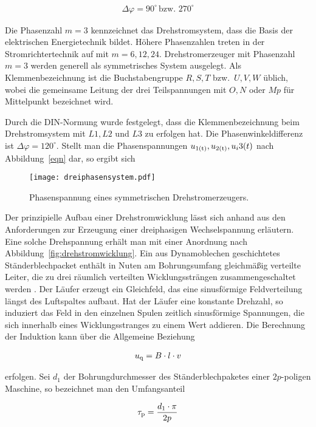 \begin{align*}
\Delta \varphi = 90^{\circ} \,\text{bzw.\ } 270^{\circ}
\end{align*}

Die Phasenzahl $m=3$ kennzeichnet das Drehstromsystem, dass die Basis der elektrischen Energietechnik bildet.
Höhere Phasenzahlen treten \zB in der Stromrichtertechnik auf mit $m=6, 12, 24$.
Drehstromerzeuger mit Phasenzahl $m=3$ werden generell als symmetrisches System ausgelegt.
Als Klemmenbezeichnung ist die Buchstabengruppe $R, S, T$ bzw.\ $U, V, W$ üblich, wobei die gemeinsame Leitung der drei Teilspannungen mit $O, N$ oder $Mp$ für Mittelpunkt bezeichnet wird.

Durch die DIN-Normung wurde festgelegt, dass die Klemmenbezeichnung beim Drehstromsystem mit $L1, L2$ und $L3$ zu erfolgen hat.
Die Phasenwinkeldifferenz ist $\Delta \varphi = 120^{\circ}$.
Stellt man die Phasenspannungen $u_{\mathrm{1(t)}}, u_{\mathrm{2(t)}}, u_i{3(t)}$ nach Abbildung~\ref{eqn} dar, so ergibt sich 

\begin{figure}[!h]
\centering
\texttt{[image: dreiphasensystem.pdf]}
\label{fig:dreiphasen}
\caption{Phasenspannung eines symmetrischen Drehstromerzeugers.}
\end{figure}

Der prinzipielle Aufbau einer Drehstromwicklung lässt sich anhand aus den Anforderungen zur Erzeugung einer dreiphasigen Wechselspannung erläutern.
Eine solche Drehspannung erhält man mit einer Anordnung nach Abbildung~\ref{fig:drehstromwicklung}.
Ein aus Dynamoblechen geschichtetes Ständerblechpacket enthält in Nuten am Bohrungsumfang gleichmäßig verteilte Leiter, die zu drei räumlich verteilten Wicklungssträngen zusammengeschaltet werden \autocite[S.~141]{fischer2009}.
Der Läufer erzeugt ein Gleichfeld, das eine sinusförmige Feldverteilung längst des Luftspaltes aufbaut.
Hat der Läufer eine konstante Drehzahl, so induziert das Feld in den einzelnen Spulen zeitlich sinusförmige Spannungen, die sich innerhalb eines Wicklungsstranges zu einem Wert addieren.
Die Berechnung der Induktion kann über die Allgemeine Beziehung

\begin{align}
u_{\mathrm{q}} = B\cdot l \cdot v
\end{align}

erfolgen.
Sei $d_1$ der Bohrungdurchmesser des Ständerblechpaketes einer $2p$-poligen Maschine, so bezeichnet man den Umfangsanteil

\begin{align}
\tau_{\mathrm{p}} = \frac{d_{\mathrm{1}} \cdot \pi}{2p}
\end{align}

